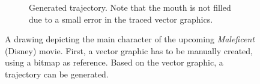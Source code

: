 \begin{figure}[h]
\begin{subfigure}[t]{0.95\textwidth}
	\caption{Generated trajectory. Note that the mouth is not filled due to a small error in the traced vector graphics.}
\end{subfigure}
\caption{A drawing depicting the main character of the upcoming \textit{Maleficent} (\textcopyright Disney) movie. First, a vector graphic has to be manually created, using a bitmap as reference. Based on the vector graphic, a trajectory can be generated.}
\end{figure}